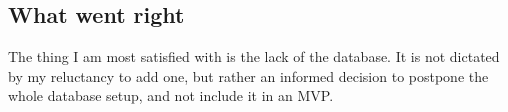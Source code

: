 \subsection{What went right}\label{sec:what-went-right}

The thing I am most satisfied with
is the lack of the database.
It is not dictated by my reluctancy to add one,
but rather an informed decision
to postpone the whole database setup,
and not include it in an MVP.
